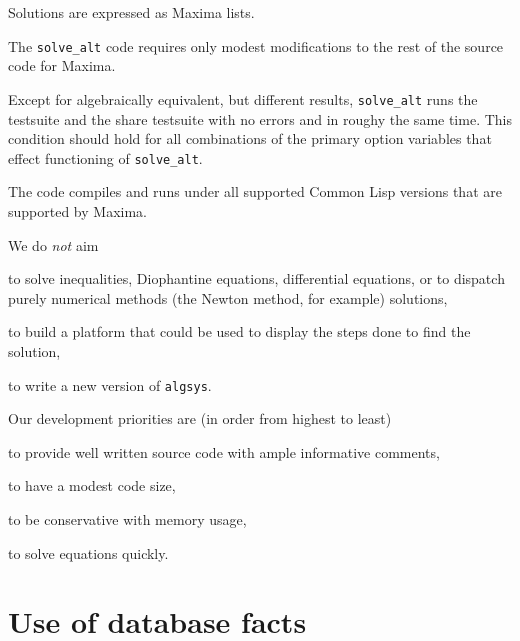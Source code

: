 \documentclass[]{article}%
\newcommand{\altsolve}{\texttt{solve\_alt}}
\newcommand{\algsys}{\texttt{algsys}}
\begin{document}
\begin{alphalist}[noitemsep]

\item  Solutions are expressed as Maxima lists.

 \item The \altsolve\/ code requires only modest modifications to the rest of the source code for  Maxima.

\item Except for algebraically equivalent, but different results, \altsolve\/  runs the testsuite and the share testsuite with no errors and in roughy the same time. This condition should hold for all combinations of the primary option variables that effect functioning of \altsolve.

\item The code compiles and runs under all supported Common Lisp versions that are supported by Maxima.
\end{alphalist}
We do \emph{not} aim
\begin{alphalist}[noitemsep]

\item to solve inequalities, Diophantine equations, differential equations, or to dispatch purely numerical methods (the Newton method, for example) solutions,

\item to build a platform that could be used to display the steps done to find the solution,

\item to write a new version of \algsys.

\end{alphalist}
Our development priorities are (in order from highest to least)

\begin{alphalist}[noitemsep]

\item  to provide well written source code with ample informative comments,

\item to have a modest code size,

\item to be conservative with memory usage,

\item to solve equations quickly.

\end{alphalist}

\section{Use of database facts}
\end{document}

